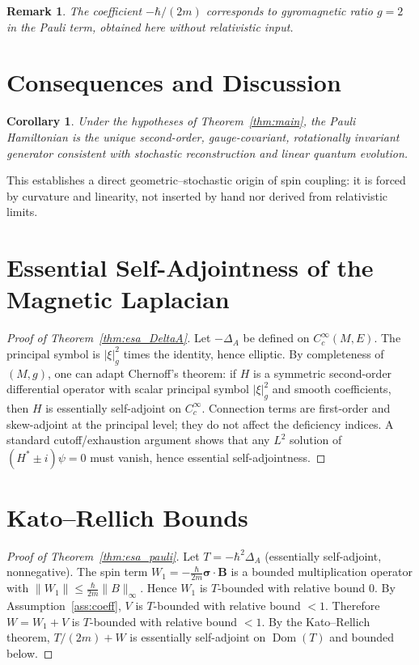 \documentclass[11pt]{article}
\newtheorem{corollary}[theorem]{Corollary}
\newtheorem{remark}[theorem]{Remark}
\DeclareMathOperator{\Dom}{Dom}
\begin{document}
\begin{remark}
The coefficient $-\hbar/(2m)$ corresponds to gyromagnetic ratio $g=2$ in the Pauli term, obtained here without relativistic input.
\end{remark}

\section{Consequences and Discussion}

\begin{corollary}
Under the hypotheses of Theorem~\ref{thm:main}, the Pauli Hamiltonian is the unique second-order, gauge-covariant, rotationally invariant generator consistent with stochastic reconstruction and linear quantum evolution.
\end{corollary}

This establishes a direct geometric--stochastic origin of spin coupling: it is forced by curvature and linearity, not inserted by hand nor derived from relativistic limits.

\appendix

\section{Essential Self-Adjointness of the Magnetic Laplacian}\label{app:esa_laplacian}

\begin{proof}[Proof of Theorem~\ref{thm:esa_DeltaA}]
Let $-\Delta_A$ be defined on $C_c^\infty(M,E)$. The principal symbol is $|\xi|_g^2$ times the identity, hence elliptic. By completeness of $(M,g)$, one can adapt Chernoff's theorem: if $H$ is a symmetric second-order differential operator with scalar principal symbol $|\xi|_g^2$ and smooth coefficients, then $H$ is essentially self-adjoint on $C_c^\infty$.
Connection terms are first-order and skew-adjoint at the principal level; they do not affect the deficiency indices. A standard cutoff/exhaustion argument shows that any $L^2$ solution of $(H^*\pm i)\psi=0$ must vanish, hence essential self-adjointness.
\end{proof}

\section{Kato--Rellich Bounds}\label{app:kato_rellich}

\begin{proof}[Proof of Theorem~\ref{thm:esa_pauli}]
Let $T=-\hbar^2\Delta_A$ (essentially self-adjoint, nonnegative). The spin term $W_1= -\frac{\hbar}{2m}\bm{\sigma}\cdot\bm{B}$ is a bounded multiplication operator with $\|W_1\|\le \frac{\hbar}{2m}\|B\|_\infty$. Hence $W_1$ is $T$-bounded with relative bound $0$.
By Assumption~\ref{ass:coeff}, $V$ is $T$-bounded with relative bound $<1$. Therefore $W=W_1+V$ is $T$-bounded with relative bound $<1$. By the Kato--Rellich theorem, $T/(2m)+W$ is essentially self-adjoint on $\Dom(T)$ and bounded below.
\end{proof}
\end{document}
